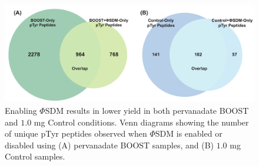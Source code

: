 \documentclass[journal=jprobs,manuscript=article]{achemso}
\begin{document}

\clearpage

\begin{figure}[t!]
\centering
\includegraphics[width=165mm]{figures/supplements/set_overlap_2.pdf}
\caption{Enabling $\Phi$SDM results in lower yield in both pervanadate BOOST and $1.0$ mg Control conditions. Venn diagrams showing the number of unique pTyr peptides observed when $\Phi$SDM is enabled or disabled using (A) pervanadate BOOST samples, and (B) $1.0$ mg Control samples.}\label{set_overlap_2}
\end{figure}

\clearpage
\end{document}
